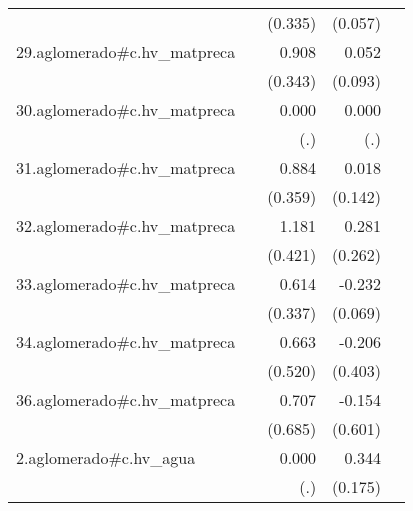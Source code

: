 {\begin{longtable}{l*{4}{D{.}{.}{-1}}}
            &                     &     (0.335)         &     (0.057)         &                     \\
\addlinespace
29.aglomerado#c.hv\_matpreca&                     &       0.908\sym{**} &       0.052         &                     \\
            &                     &     (0.343)         &     (0.093)         &                     \\
\addlinespace
30.aglomerado#c.hv\_matpreca&                     &       0.000         &       0.000         &                     \\
            &                     &         (.)         &         (.)         &                     \\
\addlinespace
31.aglomerado#c.hv\_matpreca&                     &       0.884\sym{*}  &       0.018         &                     \\
            &                     &     (0.359)         &     (0.142)         &                     \\
\addlinespace
32.aglomerado#c.hv\_matpreca&                     &       1.181\sym{**} &       0.281         &                     \\
            &                     &     (0.421)         &     (0.262)         &                     \\
\addlinespace
33.aglomerado#c.hv\_matpreca&                     &       0.614         &      -0.232\sym{***}&                     \\
            &                     &     (0.337)         &     (0.069)         &                     \\
\addlinespace
34.aglomerado#c.hv\_matpreca&                     &       0.663         &      -0.206         &                     \\
            &                     &     (0.520)         &     (0.403)         &                     \\
\addlinespace
36.aglomerado#c.hv\_matpreca&                     &       0.707         &      -0.154         &                     \\
            &                     &     (0.685)         &     (0.601)         &                     \\
\addlinespace
2.aglomerado#c.hv\_agua&                     &       0.000         &       0.344\sym{*}  &                     \\
            &                     &         (.)         &     (0.175)         &                     \\

\end{longtable}}
